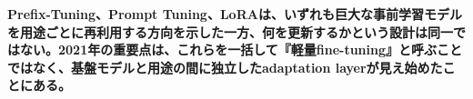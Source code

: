 \noindent\textbf{Prefix-Tuning、Prompt Tuning、LoRAは、いずれも巨大な事前学習モデルを用途ごとに再利用する方向を示した一方、何を更新するかという設計は同一ではない。2021年の重要点は、これらを一括して『軽量fine-tuning』と呼ぶことではなく、基盤モデルと用途の間に独立したadaptation layerが見え始めたことにある。}\autocite{src-ab9d63ddee6e,src-c1ad400391c9,src-dba095cd4e62}
